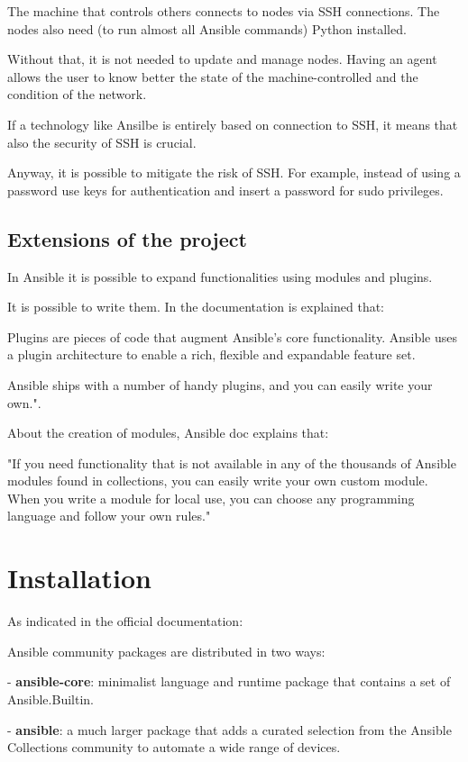 \documentclass[12pt,a4paper,openright,twoside]{book}
\begin{document}
The machine that controls others connects to nodes via SSH connections. The nodes also need (to run almost all Ansible commands) Python installed.


Without that, it is not needed to update and manage nodes. Having an agent allows the user to know better the state of the machine-controlled and the condition of the network.


If a technology like Ansilbe is entirely based on connection to SSH, it means that also the security of SSH is crucial.

Anyway, it is possible to mitigate the risk of SSH. For example, instead of using a password use keys for authentication and insert a password for sudo privileges\cite{ansibleSSH}.

\subsection{Extensions of the project}
In Ansible it is possible to expand functionalities using modules and plugins.


It is possible to write them. In the documentation is explained that:


Plugins are pieces of code that augment Ansible's core functionality. Ansible uses a plugin architecture to enable a rich, flexible and expandable feature set.


Ansible ships with a number of handy plugins, and you can easily write your own."\cite{ansibleDocPlugins}.


About the creation of modules, Ansible doc explains that:


"If you need functionality that is not available in any of the thousands of Ansible modules found in collections, you can easily write your own custom module. When you write a module for local use, you can choose any programming language and follow your own rules."\cite{ansibleDocNewModules}

\section{Installation}
As indicated in the official documentation\cite{ansibleDocInstall}:

Ansible community packages are distributed in two ways:

- \textbf{ansible-core}: minimalist language and runtime package that contains a set of Ansible.Builtin.

- \textbf{ansible}: a much larger package that adds a curated selection from the Ansible Collections community to automate a wide range of devices.
\end{document}
